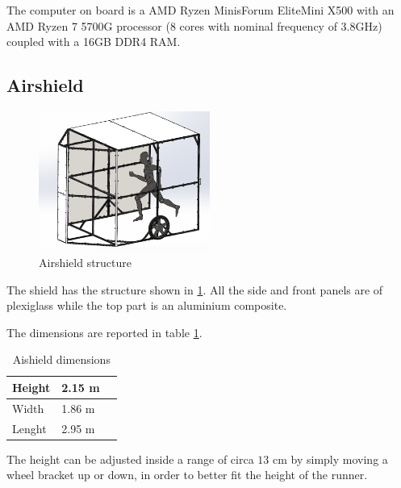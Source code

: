 \documentclass[a4paper,12pt,oneside]{book}
\begin{document}
\bigskip
The computer on board is a AMD Ryzen MinisForum EliteMini X500 with an AMD Ryzen 7 5700G processor (8 cores with nominal frequency of 3.8GHz) coupled with a 16GB DDR4 RAM.

\subsection*{Airshield}

\begin{figure}
	\centering
	\includegraphics[width=0.5\textwidth]{Shield_structure.png}
\caption{Airshield structure}
\label{Shield_structure}
\end{figure}

The shield has the structure shown in \ref{Shield_structure}.
All the side and front panels are of plexiglass while the top part is an aluminium composite.

The dimensions are reported in table \ref{tab:Shield_dimensions}.

\begin{table}[h]
\centering
\begin{tabular}{|p{1.5cm}|p{1.5cm}|p{1.5cm}|}
\hline
Height & 2.15 m \\
\hline
Width & 1.86 m \\
\hline
Lenght & 2.95 m \\
\hline
\end{tabular}
\caption{Aishield dimensions}
\label{tab:Shield_dimensions}
\end{table}
The height can be adjusted inside a range of circa $13$ cm by simply moving a wheel bracket up or down, in order to better fit the height of the runner.
\end{document}
